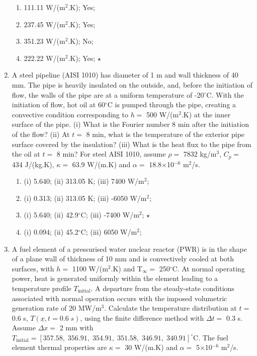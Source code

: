 \documentclass[12pts,a4paper,amsmath,amssymb,floatfix]{article}%
\begin{document}
\begin{enumerate}
\begin{enumerate}
   \item 111.11 W/(m$^{2}$.K); Yes;
   \item 237.45 W/(m$^{2}$.K); Yes;
   \item 351.23 W/(m$^{2}$.K); No;
   \item 222.22 W/(m$^{2}$.K); Yes; $\star$
\end{enumerate}
%
\item A steel pipeline (AISI 1010) has diameter of 1 m and wall thickness of 40 mm. The pipe is heavily insulated on the outside, and, before the initiation of flow, the walls of the pipe are at a uniform temperature of -20$^{\circ}$C. With the initiation of flow, hot oil at 60$^{\circ}$C is pumped through the pipe, creating a convective condition corresponding to $h=$ 500 W/(m$^{2}$.K) at the inner surface of the pipe. (i) What is the Fourier number 8 min after the initiation of the flow? (ii) At $t=$ 8 min, what is the temperature of the exterior pipe surface covered by the insulation? (iii) What is the heat flux to the pipe from the oil at $t=$ 8 min? For steel AISI 1010, assume $\rho=$ 7832 kg/m$^{3}$, $C_{p}=$ 434 J/(kg.K), $\kappa=$ 63.9 W/(m.K) and $\alpha=$ 18.8$\times$10$^{-6}$ m$^{2}$/s. %
\begin{enumerate}
   \item (i) 5.640; (ii) 313.05 K;      (iii)  7400 W/m$^{2}$;
   \item (i) 0.313; (ii) 313.05 K;      (iii) -6050 W/m$^{2}$;
   \item (i) 5.640; (ii) 42.9$^{\circ}$C; (iii) -7400 W/m$^{2}$; $\star$
   \item (i) 0.094; (ii) 45.2$^{\circ}$C; (iii)  6050 W/m$^{2}$;
\end{enumerate}
%
\item A fuel element of a pressurised water nuclear reactor (PWR) is in the shape of a plane wall of thickness of 10 mm and is convectively cooled at both surfaces, with $h=$ 1100 W/(m$^{2}$.K) and T$_{\infty}=$ 250$^{\circ}$C. At normal operating power, heat is generated uniformly within the element leading to a temperature profile $T_{\text{initial}}$. A departure from the steady-state conditions associated with normal operation occurs with the imposed volumetric generation rate of 20 MW/m$^{3}$. Calculate the temperature distribution at $t=$ 0.6 s, $T\left(\underline{x},t=0.6\;s\right)$, using the finite difference method with $\Delta t=$ 0.3 s. Assume $\Delta x=$ 2 mm with $T_{\text{initial}}=\left[357.58,\; 356.91,\; 354.91,\; 351.58,\; 346.91,\; 340.91\right]^{\circ}$C. The fuel element thermal properties are $\kappa=$ 30 W/(m.K) and $\alpha=$ 5$\times$10$^{-6}$ m$^{2}$/s. %

\end{enumerate}
\end{document}
